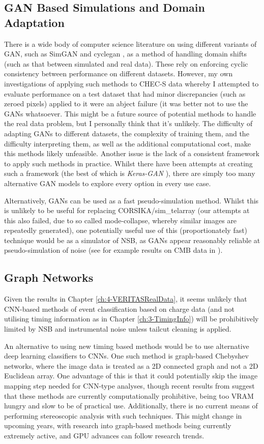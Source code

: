 \subsection{GAN Based Simulations and Domain Adaptation}
There is a wide body of computer science literature on using different variants of GAN, such as SimGAN \cite{simgan} and cyclegan \cite{cyclegan}, as a method of handling domain shifts (such as that between simulated and real data). These rely on enforcing cyclic consistency between performance on different datasets. However, my own investigations of applying such methods to CHEC-S data whereby I attempted to evaluate performance on a test dataset that had minor discrepancies (such as zeroed pixels) applied to it were an abject failure (it was better not to use the GANs whatsoever. This might be a future source of potential methods to handle the real data problem, but I personally think that it's unlikely. The difficulty of adapting GANs to different datasets, the complexity of training them, and the difficulty interpreting them, as well as the additional computational cost, make this methods likely unfeasible. Another issue is the lack of a consistent framework to apply such methods in practice. Whilst there have been attempts at creating such a framework (the best of which is \textit{Keras-GAN} \cite{kerasgan}), there are simply too many alternative GAN models to explore every option in every use case. 

Alternatively, GANs can be used as a fast pseudo-simulation method. Whilst this is unlikely to be useful for replacing CORSIKA/sim\_telarray (our attempts at this also failed, due to so called mode-collapse, whereby similar images are repeatedly generated), one potentially useful use of this (proportionately fast) technique would be as a simulator of NSB, as GANs appear reasonably reliable at pseudo-simulation of noise (see for example results on CMB data in \cite{darshgan}). 

\subsection{Graph Networks}
Given the results in Chapter \ref{ch:4-VERITASRealData}, it seems unlikely that CNN-based methods of event classification based on charge data (and not utilising timing information as in Chapter \ref{ch:3-TimingInfo}) will be prohibitively limited by NSB and instrumental noise unless tailcut cleaning is applied.

An alternative to using new timing based methods would be to use alternative deep learning classifiers to CNNs. One such method is graph-based Chebyshev networks, where the image data is treated as a 2D connected graph and not a 2D Euclidean array. One advantage of this is that it could potentially skip the image mapping step needed for CNN-type analyses, though recent results from \cite{adithesis} suggest that these methods are currently computationally prohibitive, being too VRAM hungry and slow to be of practical use. Additionally, there is no current means of performing stereoscopic analysis with such techniques. This might change in upcoming years, with research into graph-based methods being currently extremely active, and GPU advances can follow research trends.

